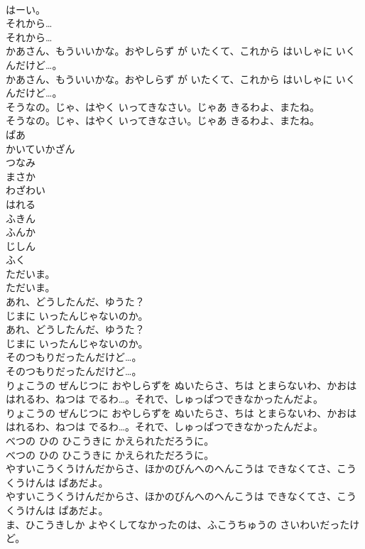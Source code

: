 \documentclass[8pt]{extreport}
\begin{document}
\begin{CJK}{UTF8}{min}
\\	はーい。 
\\	それから…	
\\	それから… 
\\	かあさん、もういいかな。おやしらず が いたくて、これから はいしゃに いくんだけど…。	
\\	かあさん、もういいかな。おやしらず が いたくて、これから はいしゃに いくんだけど…。 
\\	そうなの。じゃ、はやく いってきなさい。じゃあ きるわよ、またね。	
\\	そうなの。じゃ、はやく いってきなさい。じゃあ きるわよ、またね。 
\\	ぱあ
\\	かいていかざん
\\	つなみ
\\	まさか
\\	わざわい
\\	はれる
\\	ふきん
\\	ふんか
\\	じしん
\\	ふく
\\	ただいま。	
\\	ただいま。 
\\	あれ、どうしたんだ、ゆうた？
\\	じまに いったんじゃないのか。	
\\	あれ、どうしたんだ、ゆうた？
\\	じまに いったんじゃないのか。 
\\	そのつもりだったんだけど…。	
\\	そのつもりだったんだけど…。 
\\	りょこうの ぜんじつに おやしらずを ぬいたらさ、ちは とまらないわ、かおは はれるわ、ねつは でるわ…。それで、しゅっぱつできなかったんだよ。	
\\	りょこうの ぜんじつに おやしらずを ぬいたらさ、ちは とまらないわ、かおは はれるわ、ねつは でるわ…。それで、しゅっぱつできなかったんだよ。 
\\	べつの ひの ひこうきに かえられただろうに。	
\\	べつの ひの ひこうきに かえられただろうに。 
\\	やすいこうくうけんだからさ、ほかのびんへのへんこうは できなくてさ、こうくうけんは ぱあだよ。	
\\	やすいこうくうけんだからさ、ほかのびんへのへんこうは できなくてさ、こうくうけんは ぱあだよ。 
\\	ま、ひこうきしか よやくしてなかったのは、ふこうちゅうの さいわいだったけど。	

\end{CJK}
\end{document}
